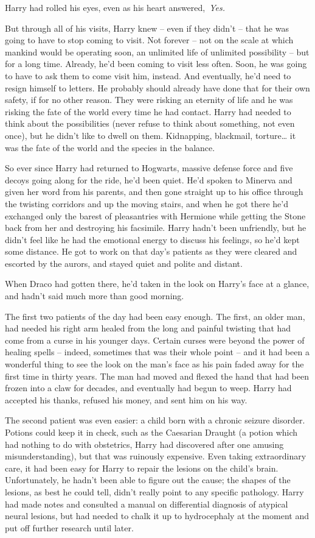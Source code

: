 Harry had rolled his eyes, even as his heart answered,~\emph{Yes.}

But through all of his visits, Harry knew -- even if they didn't -- that
he was going to have to stop coming to visit. Not forever -- not on the
scale at which mankind would be operating soon, an unlimited life of
unlimited possibility -- but for a long time. Already, he'd been coming
to visit less often. Soon, he was going to have to ask them to come
visit him, instead. And eventually, he'd need to resign himself to
letters. He probably should already have done that for their own safety,
if for no other reason. They were risking an eternity of life and he was
risking the fate of the world every time he had contact. Harry had
needed to think about the possibilities (never refuse to think about
something, not even once), but he didn't like to dwell on them.
Kidnapping, blackmail, torture\ldots{} it was the fate of the world and
the species in the balance.

So ever since Harry had returned to Hogwarts, massive defense force and
five decoys going along for the ride, he'd been quiet. He'd spoken to
Minerva and given her word from his parents, and then gone straight up
to his office through the twisting corridors and up the moving stairs,
and when he got there he'd exchanged only the barest of pleasantries
with Hermione while getting the Stone back from her and destroying his
facsimile. Harry hadn't been unfriendly, but he didn't feel like he had
the emotional energy to discuss his feelings, so he'd kept some
distance. He got to work on that day's patients as they were cleared and
escorted by the aurors, and stayed quiet and polite and distant.

When Draco had gotten there, he'd taken in the look on Harry's face at a
glance, and hadn't said much more than good morning.

The first two patients of the day had been easy enough. The first, an
older man, had needed his right arm healed from the long and painful
twisting that had come from a curse in his younger days. Certain curses
were beyond the power of healing spells -- indeed, sometimes that was
their whole point -- and it had been a wonderful thing to see the look
on the man's face as his pain faded away for the first time in thirty
years. The man had moved and flexed the hand that had been frozen into a
claw for decades, and eventually had begun to weep. Harry had accepted
his thanks, refused his money, and sent him on his way.

The second patient was even easier: a child born with a chronic seizure
disorder. Potions could keep it in check, such as the Caesarian Draught
(a potion which had nothing to do with obstetrics, Harry had discovered
after one amusing misunderstanding), but that was ruinously expensive.
Even taking extraordinary care, it had been easy for Harry to repair the
lesions on the child's brain. Unfortunately, he hadn't been able to
figure out the cause; the shapes of the lesions, as best he could tell,
didn't really point to any specific pathology. Harry had made notes and
consulted a manual on differential diagnosis of atypical neural lesions,
but had needed to chalk it up to hydrocephaly at the moment and put off
further research until later.

